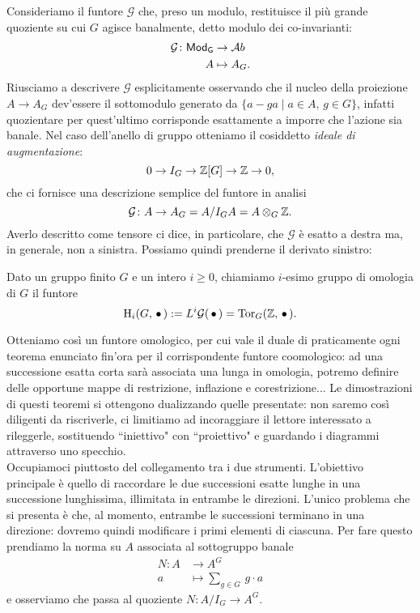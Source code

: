 
Consideriamo il funtore $ \mathcal{G} $ che, preso un modulo, restituisce il più grande quoziente su cui $ G $ agisce banalmente, detto modulo dei co-invarianti:
\begin{align*} 
\mathcal{G} \colon \mathsf{Mod}_\mathsf{G} &\to \mathcal{A}b \\
A &\mapsto A_G.
\end{align*}
Riusciamo a descrivere $ \mathcal{G} $ esplicitamente osservando che il nucleo della proiezione $ A \to A_G $ dev'essere il sottomodulo generato da $ \{ a - ga \mid a \in A, \, g \in G \} $, infatti quozientare per quest'ultimo corrisponde esattamente a imporre che l'azione sia banale. Nel caso dell'anello di gruppo otteniamo il cosiddetto \emph{ideale di augmentazione}:
\[ 0 \to I_G \to \mathbb{Z}[G] \to \mathbb{Z} \to 0, \]
che ci fornisce una descrizione semplice del funtore in analisi
\[ \mathcal{G} \colon A \to A_G = A/I_GA = A \otimes_G \mathbb{Z}. \]
Averlo descritto come tensore ci dice, in particolare, che $ \mathcal{G} $ è esatto a destra ma, in generale, non a sinistra. Possiamo quindi prenderne il derivato sinistro:

\begin{definition}
	Dato un gruppo finito $ G $ e un intero $ i \geq 0 $, chiamiamo $ i $-esimo gruppo di omologia di $ G $ il funtore
	\[ \operatorname{H}_i(G, \, \bullet \,) := L^i\mathcal{G}(\, \bullet \,) = \operatorname{Tor}_G(\mathbb{Z}, \, \bullet \, ). \]
\end{definition}

Otteniamo così un funtore omologico, per cui vale il duale di praticamente ogni teorema enunciato fin'ora per il corrispondente funtore coomologico: ad una successione esatta corta sarà associata una lunga in omologia, potremo definire delle opportune mappe di restrizione, inflazione e corestrizione... Le dimostrazioni di questi teoremi si ottengono dualizzando quelle presentate: non saremo così diligenti da riscriverle, ci limitiamo ad incoraggiare il lettore interessato a rileggerle, sostituendo \textquotedblleft iniettivo" con \textquotedblleft proiettivo" e guardando i diagrammi attraverso uno specchio. \\

Occupiamoci piuttosto del collegamento tra i due strumenti. L'obiettivo principale è quello di raccordare le due successioni esatte lunghe in una successione lunghissima, illimitata in entrambe le direzioni. L'unico problema che si presenta è che, al momento, entrambe le successioni terminano in una direzione: dovremo quindi modificare i primi elementi di ciascuna. Per fare questo prendiamo la norma su $ A $ associata al sottogruppo banale
\begin{align*}
N \colon A  & \to A^G \\
a & \mapsto \sum_{g \in G} \, g \cdot a
\end{align*}
e osserviamo che passa al quoziente $ N \colon A/I_G \to A^G $. 

